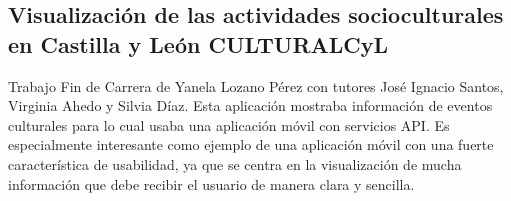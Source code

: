 	\subsection{Visualización de las actividades socioculturales en Castilla y León CULTURALCyL}
	Trabajo Fin de Carrera de Yanela Lozano Pérez con tutores José Ignacio Santos, Virginia Ahedo y Silvia Díaz.
	Esta aplicación mostraba información de eventos culturales para lo cual usaba una aplicación móvil con servicios API.
	Es especialmente interesante como ejemplo de una aplicación móvil con una fuerte característica de usabilidad, ya que se centra en la visualización de mucha información que debe recibir el usuario de manera clara y sencilla.